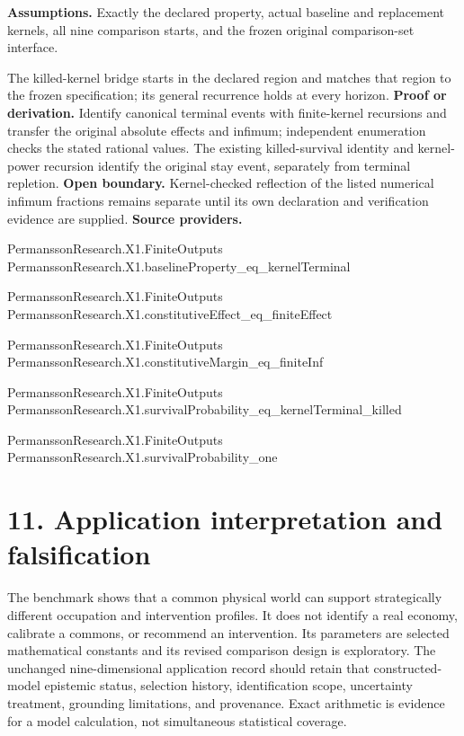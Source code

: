 \documentclass[11pt,a4paper]{article}
\begin{document}
\textbf{Assumptions.} Exactly the declared property, actual baseline and replacement kernels, all nine comparison starts, and the frozen original comparison-set interface.

The killed-kernel bridge starts in the declared region and matches that region to the frozen specification; its general recurrence holds at every horizon.
\textbf{Proof or derivation.} Identify canonical terminal events with finite-kernel recursions and transfer the original absolute effects and infimum; independent enumeration checks the stated rational values. The existing killed-survival identity and kernel-power recursion identify the original stay event, separately from terminal repletion.
\textbf{Open boundary.} Kernel-checked reflection of the listed numerical infimum fractions remains separate until its own declaration and verification evidence are supplied.
\textbf{Source providers.}
{\footnotesize\raggedright PermanssonRe\allowbreak{}search.X1.Fi\allowbreak{}niteOutputs\\ PermanssonRe\allowbreak{}search.X1.ba\allowbreak{}selineProper\allowbreak{}ty\_eq\_kernel\allowbreak{}Terminal\par}
{\footnotesize\raggedright PermanssonRe\allowbreak{}search.X1.Fi\allowbreak{}niteOutputs\\ PermanssonRe\allowbreak{}search.X1.co\allowbreak{}nstitutiveEf\allowbreak{}fect\_eq\_fini\allowbreak{}teEffect\par}
{\footnotesize\raggedright PermanssonRe\allowbreak{}search.X1.Fi\allowbreak{}niteOutputs\\ PermanssonRe\allowbreak{}search.X1.co\allowbreak{}nstitutiveMa\allowbreak{}rgin\_eq\_fini\allowbreak{}teInf\par}
{\footnotesize\raggedright PermanssonRe\allowbreak{}search.X1.Fi\allowbreak{}niteOutputs\\ PermanssonRe\allowbreak{}search.X1.su\allowbreak{}rvivalProbab\allowbreak{}ility\_eq\_ker\allowbreak{}nelTerminal\_\allowbreak{}killed\par}
{\footnotesize\raggedright PermanssonRe\allowbreak{}search.X1.Fi\allowbreak{}niteOutputs\\ PermanssonRe\allowbreak{}search.X1.su\allowbreak{}rvivalProbab\allowbreak{}ility\_one\par}
\section{11. Application interpretation and falsification}
The benchmark shows that a common physical world can support strategically different occupation and intervention profiles. It does not identify a real economy, calibrate a commons, or recommend an intervention. Its parameters are selected mathematical constants and its revised comparison design is exploratory. The unchanged nine-dimensional application record should retain that constructed-model epistemic status, selection history, identification scope, uncertainty treatment, grounding limitations, and provenance. Exact arithmetic is evidence for a model calculation, not simultaneous statistical coverage.
\end{document}
